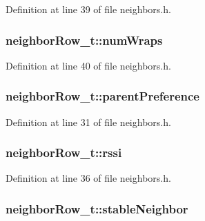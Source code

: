 Definition at line 39 of file neighbors.\+h.

\subsubsection[{\texorpdfstring{num\+Wraps}{numWraps}}]{ neighbor\+Row\+\_\+t\+::num\+Wraps}\hypertarget{structneighbor_row__t_ac1a1d7e09465447680f7243202c3430b}{}\label{structneighbor_row__t_ac1a1d7e09465447680f7243202c3430b}


Definition at line 40 of file neighbors.\+h.

\subsubsection[{\texorpdfstring{parent\+Preference}{parentPreference}}]{ neighbor\+Row\+\_\+t\+::parent\+Preference}\hypertarget{structneighbor_row__t_a70846bebfcf4c7fa48be949dd09dc267}{}\label{structneighbor_row__t_a70846bebfcf4c7fa48be949dd09dc267}


Definition at line 31 of file neighbors.\+h.

\subsubsection[{\texorpdfstring{rssi}{rssi}}]{ neighbor\+Row\+\_\+t\+::rssi}\hypertarget{structneighbor_row__t_a28b7a03233c1e2514325e44abe51a0e6}{}\label{structneighbor_row__t_a28b7a03233c1e2514325e44abe51a0e6}


Definition at line 36 of file neighbors.\+h.

\subsubsection[{\texorpdfstring{stable\+Neighbor}{stableNeighbor}}]{ neighbor\+Row\+\_\+t\+::stable\+Neighbor}\hypertarget{structneighbor_row__t_ae1bc269fa782bead16bae4b97370efd3}{}\label{structneighbor_row__t_ae1bc269fa782bead16bae4b97370efd3}


